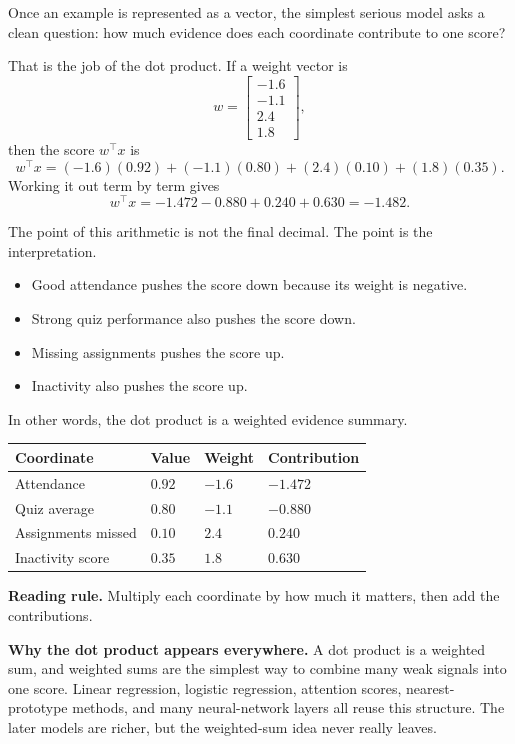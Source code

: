 Once an example is represented as a vector, the simplest serious model asks a clean question: how much evidence does each coordinate contribute to one score?

That is the job of the dot product. If a weight vector is
\[
w =
\begin{bmatrix}
-1.6 \\
-1.1 \\
2.4 \\
1.8
\end{bmatrix},
\]
then the score \(w^\top x\) is
\[
w^\top x = (-1.6)(0.92) + (-1.1)(0.80) + (2.4)(0.10) + (1.8)(0.35).
\]
Working it out term by term gives
\[
w^\top x = -1.472 - 0.880 + 0.240 + 0.630 = -1.482.
\]

The point of this arithmetic is not the final decimal. The point is the interpretation.

\begin{itemize}[leftmargin=*]
\item Good attendance pushes the score down because its weight is negative.
\item Strong quiz performance also pushes the score down.
\item Missing assignments pushes the score up.
\item Inactivity also pushes the score up.
\end{itemize}

In other words, the dot product is a weighted evidence summary.

\begin{center}
\small
\begin{tabular}{p{2.73cm}p{1.82cm}p{1.82cm}p{2.73cm}}
\toprule
Coordinate & Value & Weight & Contribution \\
\midrule
Attendance & \(0.92\) & \(-1.6\) & \(-1.472\) \\
Quiz average & \(0.80\) & \(-1.1\) & \(-0.880\) \\
Assignments missed & \(0.10\) & \(2.4\) & \(0.240\) \\
Inactivity score & \(0.35\) & \(1.8\) & \(0.630\) \\
\bottomrule
\end{tabular}

\medskip
\noindent\textbf{Reading rule.} Multiply each coordinate by how much it matters, then add the contributions.
\end{center}

\begin{mathlens}
\textbf{Why the dot product appears everywhere.} A dot product is a weighted sum, and weighted sums are the simplest way to combine many weak signals into one score. Linear regression, logistic regression, attention scores, nearest-prototype methods, and many neural-network layers all reuse this structure. The later models are richer, but the weighted-sum idea never really leaves.
\end{mathlens}

